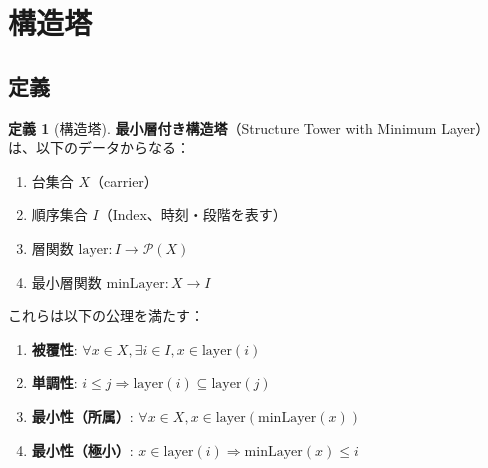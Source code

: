 \documentclass[a4paper,11pt]{ltjsarticle}
\theoremstyle{definition}
\newtheorem{definition}{定義}[section]
\newcommand{\layer}{\mathrm{layer}}
\newcommand{\minLayer}{\mathrm{minLayer}}
\begin{document}
\section{構造塔}\label{sec:structure-tower}

\subsection{定義}

\begin{definition}[構造塔]
\textbf{最小層付き構造塔}（Structure Tower with Minimum Layer）は、以下のデータからなる：
\begin{enumerate}
  \item 台集合 $X$（carrier）
  \item 順序集合 $I$（Index、時刻・段階を表す）
  \item 層関数 $\layer : I \to \mathcal{P}(X)$
  \item 最小層関数 $\minLayer : X \to I$
\end{enumerate}

これらは以下の公理を満たす：
\begin{enumerate}
  \item \textbf{被覆性}: $\forall x \in X, \exists i \in I, x \in \layer(i)$
  \item \textbf{単調性}: $i \le j \Rightarrow \layer(i) \subseteq \layer(j)$
  \item \textbf{最小性（所属）}: $\forall x \in X, x \in \layer(\minLayer(x))$
  \item \textbf{最小性（極小）}: $x \in \layer(i) \Rightarrow \minLayer(x) \le i$
\end{enumerate}
\end{definition}
\end{document}
